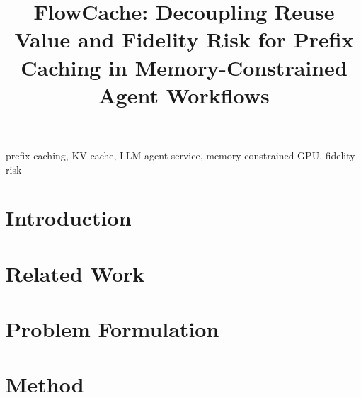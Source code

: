 \documentclass[conference]{IEEEtran}
\begin{document}
\title{FlowCache: Decoupling Reuse Value and Fidelity Risk for Prefix Caching in Memory-Constrained Agent Workflows}

\author{
}

\maketitle

\begin{abstract}
\end{abstract}

\begin{IEEEkeywords}
prefix caching, KV cache, LLM agent service, memory-constrained GPU, fidelity risk
\end{IEEEkeywords}

\section{Introduction}

\section{Related Work}

\section{Problem Formulation}

\section{Method}
\end{document}
